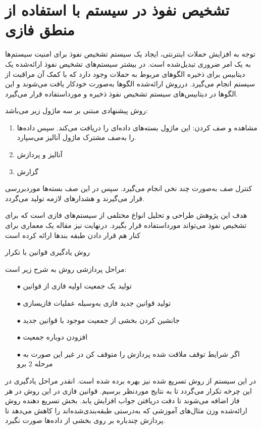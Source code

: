 \documentclass[a4paper,oneside,12pt]{report}
\begin{document}
\section{تشخیص نفوذ در سیستم با استفاده از منطق فازی}
توجه به افزایش حملات اینترنتی، ایجاد یک سیستم تشخیص نفوذ برای امنیت سیستم‌ها به یک امر ضروری تبدیل‌شده است. در بیشتر سیستم‌های تشخیص نفوذ ارائه‌شده یک دیتابیس برای ذخیره الگوهای مربوط به حملات وجود دارد که با کمک آن مراقبت از سیستم انجام می‌گیرد. درروش 
ارائه‌شده 
\cite{7} 
الگوها به‌صورت خودکار یافت می‌شوند و این الگوها در دیتابیس‌های سیستم تشخیص نفوذ ذخیره و مورداستفاده قرار می‌گیرد.

روش پیشنهادی مبتنی بر سه ماژول زیر می‌باشد:
\begin{enumerate}
\item
مشاهده و صف کردن: این ماژول بسته‌های داده‌ای را دریافت می‌کند. سپس داده‌ها را به‌صف مشترک ماژول آنالیز می‌سپارد.
\item
آنالیز و پردازش
\item
گزارش
\end{enumerate}	
کنترل صف به‌صورت چند نخی انجام می‌گیرد. سپس در این صف بسته‌ها موردبررسی قرار می‌گیرند و هشدارهای لازمه تولید می‌گردد.

 هدف این پژوهش 
 \cite{7} 
 طراحی و تحلیل انواع مختلفی از سیستم‌های فازی است که برای تشخیص نفوذ می‌تواند مورداستفاده قرار بگیرد. درنهایت نیز مقاله یک معماری برای کنار هم قرار دادن طبقه بندها ارائه کرده است
 
روش یادگیری قوانین با تکرار

مراحل پردازشی روش به شرح زیر است:
\begin{itemize}
\item[$\bullet$]
تولید یک جمعیت اولیه فازی از قوانین 
\item[$\bullet$]
تولید قوانین جدید فازی 
به‌وسیله عملیات فازی\/سازی
\item[$\bullet$]
جانشین کردن بخشی از جمعیت موجود با قوانین جدید
\item[$\bullet$]
افزودن دوباره جمعیت
\item[$\bullet$]
اگر شرایط توقف ملاقت شده پردازش را متوقف کن در غیر این صورت به مرحله 
$2$
برو
\end{itemize}
در این سیستم از روش تسریع شده نیز بهره برده شده است. انقدر مراحل یادگیری در این چرخه تکرار می‌گردد تا به نتایج موردنظر برسیم. قوانین فازی در این روش در هر فاز اضافه می‌شوند تا دقت دریافتن جواب افزایش یابد. بخش تسریع دهنده روش ارائه‌شده وزن مثال‌های آموزشی که به‌درستی طبقه‌بندی‌شده‌اند را کاهش می‌دهد تا پردازش چندباره بر روی بخشی از داده‌ها صورت نگیرد.
\end{document}
